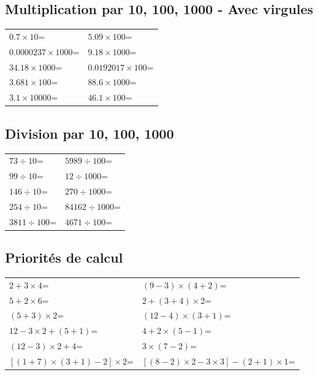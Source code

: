 \documentclass[answers]{exam}
\newcommand{\ex}[1]{#1\;=\;\dotfill}
\begin{document}
\subsection*{Multiplication par 10, 100, 1000 - Avec virgules}
\begin{center}
\begin{tabular}{|L|L|}
\hline
\ex{$0.7\times10$} & \ex{$5.09\times100$} \\
\ex{$0.0000237\times1000$} & \ex{$9.18\times1000$} \\
\ex{$34.18\times1000$} & \ex{$0.0192017\times100$} \\
\ex{$3.681\times100$} & \ex{$88.6\times1000$} \\
\ex{$3.1\times10000$} & \ex{$46.1\times100$} \\
\hline
\end{tabular}
\end{center}

\subsection*{Division par 10, 100, 1000}
\begin{center}
\begin{tabular}{|L|L|}
\hline
\ex{$73\div10$} & \ex{$5989\div100$} \\
\ex{$99\div10$} & \ex{$12\div1000$} \\
\ex{$146\div10$} & \ex{$270\div1000$} \\
\ex{$254\div10$} & \ex{$84162\div1000$} \\
\ex{$3811\div100$} & \ex{$4671\div100$} \\
\hline
\end{tabular}
\end{center}

\subsection*{Priorités de calcul}
\begin{center}
\begin{tabular}{|L|L|}
\hline
\ex{$2 + 3\times4$} & \ex{$(9-3)\times(4+2)$} \\
\ex{$5 + 2\times6$} & \ex{$2 + (3+4)\times2$} \\
\ex{$(5+3)\times2$} & \ex{$(12-4)\times(3+1)$} \\
\ex{$12 - 3\times2+(5+1)$} & \ex{$4 + 2\times(5-1)$} \\
\ex{$(12-3)\times2+4$} & \ex{$3\times(7-2)$} \\
\ex{$[(1+7)\times (3+1) - 2] \times2$} & \ex{$[(8-2)\times2 - 3\times3] - (2 + 1) \times 1$}  \\
\hline
\end{tabular}
\end{center}
\end{document}
